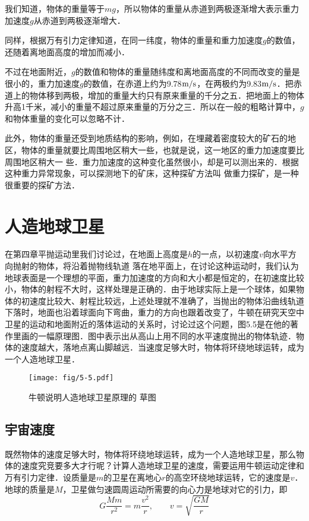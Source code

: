 我们知道，物体的重量等于$mg$，所以物体的重量从赤道到两极逐渐增大表示重力加速度$g$从赤道到两极逐渐增大．

同样，根据万有引力定律知道，在同一纬度，物体的重量和重力加速度$g$的数值，还随着离地面高度的增加而减小．

不过在地面附近，$g$的数值和物体的重量随纬度和离地面高度的不同而改变的量是很小的，重力加速度$g$的数值，在赤道上约为9.78$\text{m}/\text{s}$，在两极约为9.83$\text{m}/\text{s}$．把赤道上的物体移到两极，增加的重量大约只有原来重量的千分之五．把地面上的物体升高1千米，减小的重量不超过原来重量的万分之三．所以在一般的粗略计算中，$g$和物体重量的变化可以忽略不计．

此外，物体的重量还受到地质结构的影响，例如，在埋藏着密度较大的矿石的地区，物体的重量就要比周围地区稍大一些，也就是说，这一地区的重力加速度要比周围地区稍大一
些．重力加速度的这种变化虽然很小，却是可以测出来的．根据这种重力异常现象，可以探测地下的矿床，这种探矿方法叫
做重力探矿，是一种很重要的探矿方法．

\section{人造地球卫星}

在第四章平抛运动里我们讨论过，在地面上高度是$h$的一点，以初速度$v$向水平方向抛射的物体，将沿着抛物线轨道
落在地平面上，在讨论这种运动时，我们认为地球表面是一个理想的平面，重力加速度的方向和大小都是恒定的，在初速度比较小，物体的射程不大时，这样处理是正确的．由于地球实际上是一个球体，如果物体的初速度比较大、射程比较远，上述处理就不准确了，当抛出的物体沿曲线轨道下落时，地面也沿着球面向下弯曲，重力的方向也跟着改变了，牛顿在研究天空中卫星的运动和地面附近的落体运动的关系时，讨论过这个问题，图5.5是在他的著作里画的一幅原理图．图中表示出从高山上用不同的水平速度抛出的物体轨迹．物体的速度越大，落地点离山脚越远．当速度足够大时，物体将环绕地球运转，成为一个人造地球卫星．
\begin{figure}\centering
\texttt{[image: fig/5-5.pdf]}
\caption{牛顿说明人造地球卫星原理的
草图}
\end{figure}

\subsection{宇宙速度}

既然物体的速度足够大时，物体将环绕地球运转，成为一个人造地球卫星，那么物体的速度究竞要多大才行呢？计算人造地球卫星的速度，需要运用牛顿运动定律和万有引力定律．设质量是$m$的卫星在离地心$r$的高空环绕地球运转，它的速度是$v$．地球的质量是$M$，卫星做匀速圆周运动所需要的向心力是地球对它的引力，即
\[G\frac{Mm}{r^2}=m\frac{v^2}{r},\qquad v=\sqrt{\frac{GM}{r}} \]

